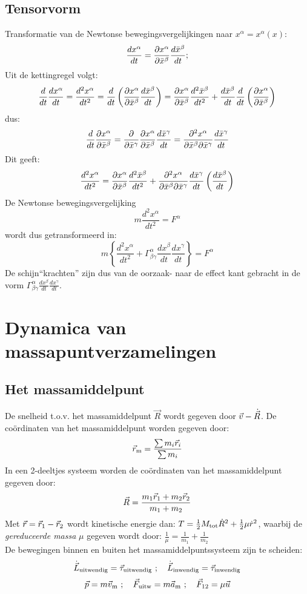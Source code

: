 \subsection{Tensorvorm}
Transformatie van de Newtonse bewegingsvergelijkingen naar $x^\alpha=x^\alpha(x)$:
\[
\frac{dx^\alpha}{dt}=\frac{\partial x^\alpha}{\partial \bar{x}^\beta}\frac{d\bar{x}^\beta}{dt};
\]
Uit de kettingregel volgt:
\[
\frac{d}{dt}\frac{dx^\alpha}{dt}=\frac{d^2x^\alpha}{dt^2}=\frac{d}{dt}
\left(\frac{\partial x^\alpha}{\partial \bar{x}^\beta}\frac{d\bar{x}^\beta}{dt}\right)=
\frac{\partial x^\alpha}{\partial \bar{x}^\beta}\frac{d^2\bar{x}^\beta}{dt^2}+
\frac{d\bar{x}^\beta}{dt}\frac{d}{dt}\left(\frac{\partial x^\alpha}{\partial \bar{x}^\beta}\right)
\]
dus:
\[
\frac{d}{dt}\frac{\partial x^\alpha}{\partial \bar{x}^\beta}=\frac{\partial }{\partial \bar{x}^\gamma}\frac{\partial x^\alpha}{\partial \bar{x}^\beta}\frac{d\bar{x}^\gamma}{dt}=
\frac{\partial^2x^\alpha}{\partial\bar{x}^\beta\partial\bar{x}^\gamma}\frac{d\bar{x}^\gamma}{dt}
\]
Dit geeft:
\[
\frac{d^2x^\alpha}{dt^2}=\frac{\partial x^\alpha}{\partial \bar{x}^\beta}\frac{d^2\bar{x}^\beta}{dt^2}+
\frac{\partial^2x^\alpha}{\partial\bar{x}^\beta\partial\bar{x}^\gamma}\frac{d\bar{x}^\gamma}{dt}
\left(\frac{d\bar{x}^\beta}{dt}\right)
\]
De Newtonse bewegingsvergelijking
\[
m\frac{d^2x^\alpha}{dt^2}=F^\alpha
\]
wordt dus getransformeerd in:
\[
m\left\{\frac{d^2x^\alpha}{dt^2}+\Gamma_{\beta\gamma}^\alpha
\frac{dx^\beta}{dt}\frac{dx^\gamma}{dt}\right\}=F^\alpha
\]
De schijn``krachten'' zijn dus van de oorzaak- naar de effect kant gebracht in
de vorm $\displaystyle\Gamma_{\beta\gamma}^\alpha\frac{dx^\beta}{dt}\frac{dx^\gamma}{dt}$.

\section{Dynamica van massapuntverzamelingen}
\subsection{Het massamiddelpunt}
De snelheid t.o.v. het massamiddelpunt $\vec{R}$ wordt gegeven door $\vec{v}-\dot{\vec{R}}$.
De co\"ordinaten van het massamiddelpunt worden gegeven door:
\[
\vec{r}_{\rm m}=\frac{\sum m_i\vec{r}_i}{\sum m_i}
\]
In een 2-deeltjes systeem worden de co\"ordinaten van het massamiddelpunt
gegeven door:
\[
\vec{R}=\frac{m_1\vec{r}_1+m_2\vec{r}_2}{m_1+m_2}
\]
Met $\vec{r}=\vec{r}_1-\vec{r}_2$ wordt kinetische energie dan:
$T=\mbox{$\frac{1}{2}$} M_{\rm tot}\dot{R}^2+\mbox{$\frac{1}{2}$}\mu\dot{r}^2$, waarbij de
{\it gereduceerde massa} $\mu$ gegeven wordt door:
$\displaystyle\frac{1}{\mu}=\frac{1}{m_1}+\frac{1}{m_2}$\\
De bewegingen binnen en buiten het massamiddelpuntssysteem zijn te scheiden:
\[
\dot{\vec{L}}_{\rm uitwendig}=\vec{\tau}_{\rm uitwendig}~;~~~
\dot{\vec{L}}_{\rm inwendig}=\vec{\tau}_{\rm inwendig}
\]
\[
\vec{p}=m\vec{v}_{\rm m}~;~~~\vec{F}_{\rm uitw}=m\vec{a}_{\rm m}~;~~~\vec{F}_{12}=\mu\vec{u}
\]
